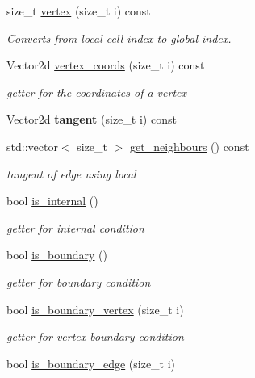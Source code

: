 \begin{DoxyCompactItemize}
size\+\_\+t \hyperlink{classMeshFramework2D_1_1Cell2D_a0c94721b435519f5891a49549cfca560}{vertex} (size\+\_\+t i) const
\begin{DoxyCompactList}\small\item\em Converts from local cell index to global index. \end{DoxyCompactList}\item 
Vector2d \hyperlink{classMeshFramework2D_1_1Cell2D_a80dd9d0a3bffccc32f1c9b89dc0ae0d1}{vertex\+\_\+coords} (size\+\_\+t i) const
\begin{DoxyCompactList}\small\item\em getter for the coordinates of a vertex \end{DoxyCompactList}\item 
\mbox{\label{classMeshFramework2D_1_1Cell2D_a72a389a2c4d5fa6ba34018c510470c33}} 
Vector2d {\bfseries tangent} (size\+\_\+t i) const
\item 
std\+::vector$<$ size\+\_\+t $>$ \hyperlink{classMeshFramework2D_1_1Cell2D_a8f31d078c59aa8cbe397fbe789500835}{get\+\_\+neighbours} () const
\begin{DoxyCompactList}\small\item\em tangent of edge using local \end{DoxyCompactList}\item 
bool \hyperlink{classMeshFramework2D_1_1Cell2D_a6c21f565043627c7032489dd0e5b22b1}{is\+\_\+internal} ()
\begin{DoxyCompactList}\small\item\em getter for internal condition \end{DoxyCompactList}\item 
bool \hyperlink{classMeshFramework2D_1_1Cell2D_a4834404c5bfd4a4ee3f85118a5dc8bcd}{is\+\_\+boundary} ()
\begin{DoxyCompactList}\small\item\em getter for boundary condition \end{DoxyCompactList}\item 
bool \hyperlink{classMeshFramework2D_1_1Cell2D_a9374d59391f8e14f2840527baa67ab0a}{is\+\_\+boundary\+\_\+vertex} (size\+\_\+t i)
\begin{DoxyCompactList}\small\item\em getter for vertex boundary condition \end{DoxyCompactList}\item 
bool \hyperlink{classMeshFramework2D_1_1Cell2D_aa0799aed687569c66741e8259d4858f6}{is\+\_\+boundary\+\_\+edge} (size\+\_\+t i)

\end{DoxyCompactItemize}
